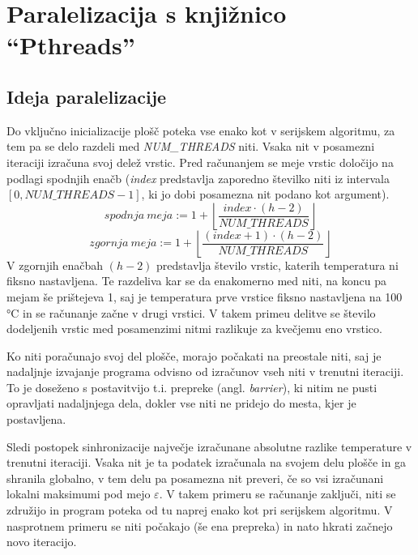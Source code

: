 \documentclass[a4paper,titlepage,11pt]{article}
\begin{document}
\pagebreak

\section{Paralelizacija s knjižnico ``Pthreads''}

\subsection{Ideja paralelizacije}

Do vključno inicializacije plošč poteka vse enako kot v serijskem algoritmu, za tem pa se delo razdeli med \textit{NUM\_THREADS} niti. Vsaka nit v posamezni iteraciji izračuna svoj delež vrstic. Pred računanjem se meje vrstic določijo na podlagi spodnjih enačb (\textit{index} predstavlja zaporedno številko niti iz intervala $\left[0, NUM\_THREADS - 1\right]$, ki jo dobi posamezna nit podano kot argument).
\begin{equation}
spodnja \ meja := 1 + \left \lfloor{\frac{index \cdot (h - 2)}{NUM\_THREADS}}\right \rfloor
\end{equation}
\begin{equation}
zgornja \ meja := 1 + \left \lfloor{\frac{(index+1) \cdot (h - 2)}{NUM\_THREADS}}\right \rfloor
\end{equation}
V zgornjih enačbah $(h - 2)$ predstavlja število vrstic, katerih temperatura ni fiksno nastavljena. Te razdeliva kar se da enakomerno med niti, na koncu pa mejam še prištejeva 1, saj je temperatura prve vrstice fiksno nastavljena na 100 °C in se računanje začne v drugi vrstici. V takem primeu delitve se število dodeljenih vrstic med posamenzimi nitmi razlikuje za kvečjemu eno vrstico.

Ko niti poračunajo svoj del plošče, morajo počakati na preostale niti, saj je nadaljnje izvajanje programa odvisno od izračunov vseh niti v trenutni iteraciji. To je doseženo s postavitvijo t.i. prepreke (angl. \textit{barrier}), ki nitim ne pusti opravljati nadaljnjega dela, dokler vse niti ne pridejo do mesta, kjer je postavljena.

Sledi postopek sinhronizacije največje izračunane absolutne razlike temperature v trenutni iteraciji. Vsaka nit je ta podatek izračunala na svojem delu plošče in ga shranila globalno, v tem delu pa posamezna nit preveri, če so vsi izračunani lokalni maksimumi pod mejo \(\varepsilon\). V takem primeru se računanje zaključi, niti se združijo in program poteka od tu naprej enako kot pri serijskem algoritmu. V nasprotnem primeru se niti počakajo (še ena prepreka) in nato hkrati začnejo novo iteracijo.
\end{document}
